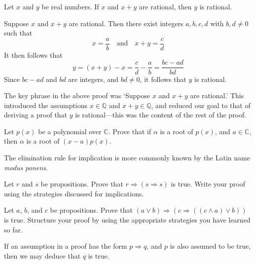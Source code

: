 \begin{proposition}
\label{propRationalTwoOfThree}
Let $x$ and $y$ be real numbers. If $x$ and $x+y$ are rational, then $y$ is rational.
\end{proposition}

\begin{cproof}
Suppose $x$ and $x+y$ are rational. Then there exist integers $a,b,c,d$ with $b,d \ne 0$ such that
\[
x = \frac{a}{b} \quad \text{and} \quad x+y = \frac{c}{d}
\]
It then follows that
\[
y = (x+y)-x = \frac{c}{d}-\frac{a}{b} = \frac{bc-ad}{bd}
\]
Since $bc-ad$ and $bd$ are integers, and $bd \ne 0$, it follows that $y$ is rational.
\end{cproof}

The key phrase in the above proof was `Suppose $x$ and $x+y$ are rational.' This introduced the assumptions $x \in \mathbb{Q}$ and $x+y \in \mathbb{Q}$, and reduced our goal to that of deriving a proof that $y$ is rational---this was the content of the rest of the proof.

\begin{exercise}
Let $p(x)$ be a polynomial over $\mathbb{C}$. Prove that if $\alpha$ is a root of $p(x)$, and $a \in \mathbb{C}$, then $\alpha$ is a root of $(x-a)p(x)$.
\end{exercise}

The elimination rule for implication \elimrule{\Rightarrow} is more commonly known by the Latin name \textit{modus ponens}.

\begin{exercise}
Let $r$ and $s$ be propositions. Prove that $r \Rightarrow (s \Rightarrow s)$ is true. Write your proof using the strategies discussed for implications.
\end{exercise}

\begin{exercise}
Let $a$, $b$, and $c$ be propositions. Prove that $(a \vee b) \Rightarrow (c \Rightarrow ((c \wedge a) \vee b))$ is true. Structure your proof by using the appropriate strategies you have learned so far.
\end{exercise}

\begin{strategy}
\label{strAssumingImplicationsDirect}
If an assumption in a proof has the form $p \Rightarrow q$, and $p$ is also assumed to be true, then we may deduce that $q$ is true.
\end{strategy}

